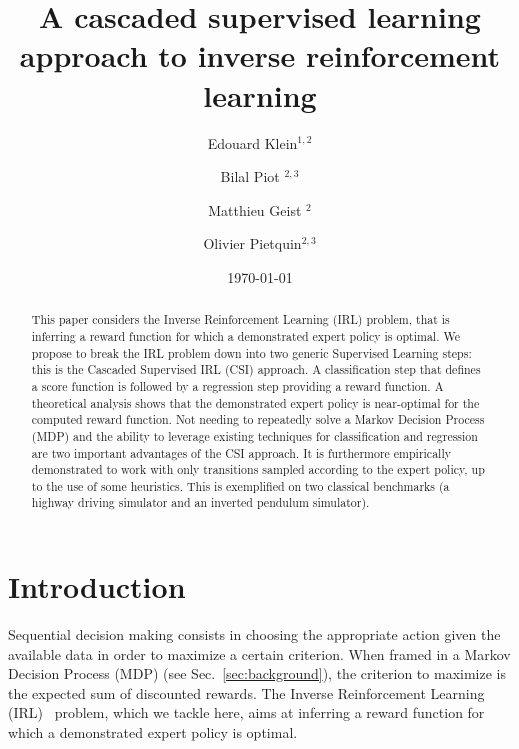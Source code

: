 \documentclass[smallextended]{svjour3}
\begin{document}
\title{A cascaded supervised learning approach to inverse reinforcement learning}
\author{Edouard Klein$^{1,2}$ \and Bilal Piot $^{2,3}$\and Matthieu Geist $^{2}$\and Olivier Pietquin$^{2,3}$}
\date{\today}


\maketitle

\begin{abstract}
  This paper considers the Inverse Reinforcement Learning (IRL) problem, that is inferring a reward function for which a demonstrated expert policy is optimal.
We propose to break the IRL problem down into two generic Supervised Learning steps: this is the Cascaded Supervised IRL (CSI) approach. A classification step that defines a score function is followed by a regression step providing a reward function.
A theoretical analysis shows that the demonstrated expert policy is near-optimal for the computed reward function.
Not needing to repeatedly solve a Markov Decision Process (MDP) and the ability to leverage existing techniques for classification and regression are two important advantages of the CSI approach. It is furthermore empirically demonstrated to work with only transitions sampled according to the expert policy, up to the use of some heuristics. This is exemplified on two classical benchmarks (a highway driving simulator and an inverted pendulum simulator).
  \end{abstract}
\section{Introduction}
\label{sec-2}
Sequential decision making consists in choosing the appropriate action given the available data in order to maximize a certain criterion. When framed in a Markov Decision Process (MDP) (see Sec.~\ref{sec:background}), the criterion to maximize is the expected sum of discounted rewards. The Inverse Reinforcement Learning (IRL)~\cite{russell1998learning} problem, which we tackle here, aims at inferring a reward function for which a demonstrated expert policy is optimal.
\end{document}
